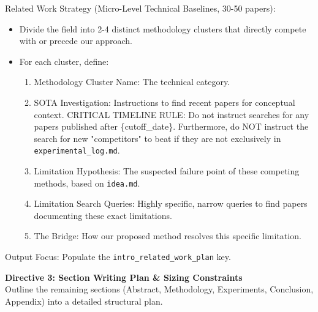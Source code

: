\noindent Related Work Strategy (Micro-Level Technical Baselines, 30-50 papers):
\begin{itemize}
    \item Divide the field into 2-4 distinct methodology clusters that directly compete with or precede our approach.
    \item For each cluster, define:
    \begin{enumerate}
        \item Methodology Cluster Name: The technical category.
        \item SOTA Investigation: Instructions to find recent papers for conceptual context. CRITICAL TIMELINE RULE: Do not instruct searches for any papers published after \{cutoff\_date\}. Furthermore, do NOT instruct the search for new "competitors" to beat if they are not exclusively in \texttt{experimental\_log.md}.
        \item Limitation Hypothesis: The suspected failure point of these competing methods, based on \texttt{idea.md}.
        \item Limitation Search Queries: Highly specific, narrow queries to find papers documenting these exact limitations.
        \item The Bridge: How our proposed method resolves this specific limitation.
    \end{enumerate}
\end{itemize}
Output Focus: Populate the \texttt{intro\_related\_work\_plan} key.

\vspace{1em}
\noindent\textbf{Directive 3: Section Writing Plan \& Sizing Constraints}\\
\vspace{0.5em}
Outline the remaining sections (Abstract, Methodology, Experiments, Conclusion, Appendix) into a detailed structural plan.

